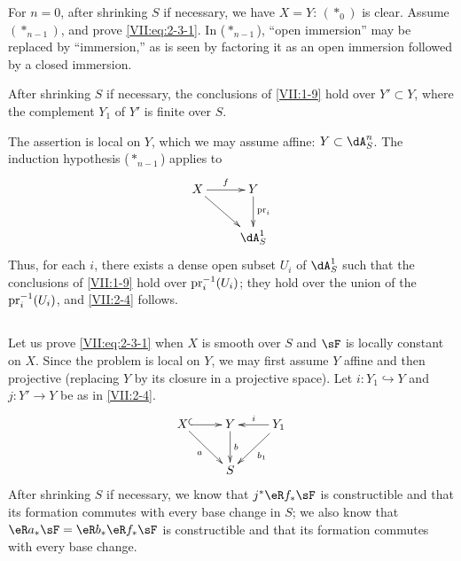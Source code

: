 For $n=0$, after shrinking $S$ if necessary, we have $X=Y$: $(\ast_0)$ is
clear. Assume $(\ast_{n-1})$, and prove \eqref{VII:eq:2-3-1}. In
($\ast_{n-1}$), ``open immersion'' may be replaced by ``immersion,'' as is
seen by factoring it as an open immersion followed by a closed immersion.





\begin{lemma_}\label{VII:2-4}
After shrinking $S$ if necessary, the conclusions of \ref{VII:1-9} hold over
$Y'\subset Y$, where the complement $Y_1$ of $Y'$ is finite over $S$.
\end{lemma_}

The assertion is local on $Y$, which we may assume affine:
$Y\subset \dA_S^n$. The induction hypothesis ($\ast_{n-1}$) applies to
\[\xymatrix{
  X \ar[r]^-f \ar[dr] 
    & Y \ar[d]^-{\pr_i} \\
  & \dA_S^1 
}\]
Thus, for each $i$, there exists a dense open subset $U_i$ of $\dA_S^1$ such
that the conclusions of \ref{VII:1-9} hold over $\mathrm{pr}_i^{-1}(U_i)$; they hold
over the union of the $\mathrm{pr}_i^{-1}(U_i)$, and \ref{VII:2-4} follows.





\addtocounter{subsection}{1} %
\subsection{}\label{VII:2-6}

Let us prove \eqref{VII:eq:2-3-1} when $X$ is smooth over $S$ and $\sF$ is
locally constant on $X$. Since the problem is local on $Y$, we may first
assume $Y$ affine and then projective (replacing $Y$ by its closure in a
projective space). Let $i:Y_1\hookrightarrow Y$ and $j:Y' \to Y$ be as in
\ref{VII:2-4}.
\[\xymatrix{
  X \ar@{^{(}->}[r] \ar[dr]_-a 
    & Y \ar[d]^-b 
    & \ar[l]_-i \ar[dl]^-{b_1} Y_1 \\
  & S 
}\] 
After shrinking $S$ if necessary, we know that $j^\ast \eR f_\ast \sF$ is
constructible and that its formation commutes with every base change in $S$;
we also know that $\eR a_\ast \sF = \eR b_\ast \eR f_\ast \sF$ is
constructible and that its formation commutes with every base change.

